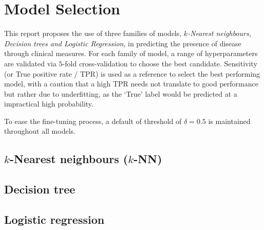 \section{Model Selection}

This report proposes the use of three families of models, \textit{\( k \)-Nearest neighbours, Decision trees and Logistic Regression}, in predicting the presence of disease through clinical measures. For each family of model, a range of hyperparameters are validated via \( 5 \)-fold cross-validation to choose the best candidate. Sensitivity (or True positive rate / TPR) is used as a reference to select the best performing model, with a caution that a high TPR needs not translate to good performance but rather due to underfitting, as the `True' label would be predicted at a impractical high probability.

To ease the fine-tuning process, a default of threshold of \( \delta = 0.5 \) is maintained throughout all models.

\subsection{\( k \)-Nearest neighbours (\( k \)-NN)}


\subsection{Decision tree}


\subsection{Logistic regression}

